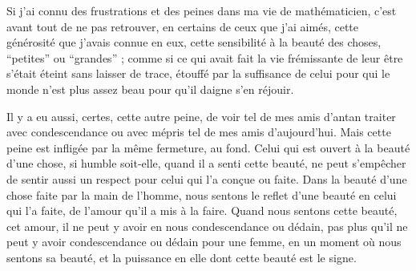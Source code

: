 Si j'ai connu des frustrations et des peines dans ma vie de mathématicien, c'est avant tout de ne pas retrouver, en certains de ceux que j'ai aimés, cette générosité que j'avais connue en eux, cette sensibilité à la beauté des choses, ``petites'' ou ``grandes'' ; comme si ce qui avait fait la vie frémissante de leur être s'était éteint sans laisser de trace, étouffé par la suffisance de celui pour qui le monde n'est plus assez beau pour qu'il daigne s'en réjouir.

Il y a eu aussi, certes, cette autre peine, de voir tel de mes amis d'antan traiter avec condescendance ou avec mépris tel de mes amis d'aujourd'hui. Mais cette peine est infligée par la même fermeture, au fond. Celui qui est ouvert à la beauté d'une chose, si humble soit-elle, quand il a senti cette beauté, ne peut s'empêcher de sentir aussi un respect pour celui qui l'a conçue ou faite. Dans la beauté d'une chose faite par la main de l'homme, nous sentons le reflet d'une beauté en celui qui l'a faite, de l'amour qu'il a mis à la faire. Quand nous sentons cette beauté, cet amour, il ne peut y avoir en nous condescendance ou dédain, pas plus qu'il ne peut y avoir condescendance ou dédain pour une femme, en un moment où nous sentons sa beauté, et la puissance en elle dont cette beauté est le signe.




